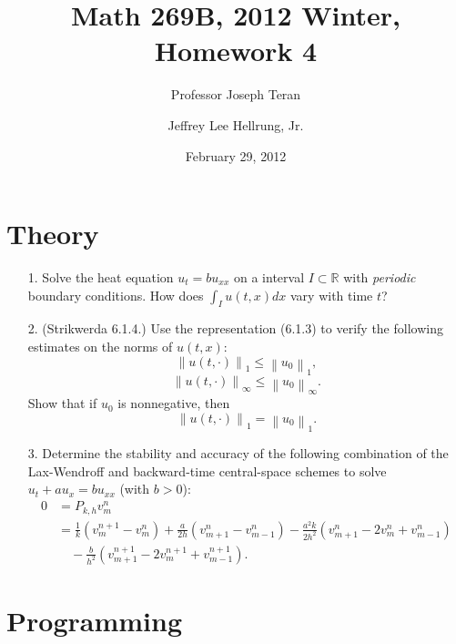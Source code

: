 \documentclass{article}
\providecommand{\norm}[1]{\left\lVert#1\right\rVert}
\begin{document}
\title{Math 269B, 2012 Winter, Homework 4}
\date{February 29, 2012}
\author{Professor Joseph Teran \and Jeffrey Lee Hellrung, Jr.}
\maketitle

\section{Theory}

\begin{itemize}

\item[1.] Solve the heat equation $u_t = b u_{xx}$ on a interval $I \subset \mathbb{R}$ with \emph{periodic} boundary conditions. How does $\int_I u(t,x) dx$ vary with time $t$?

\item[2.] (Strikwerda 6.1.4.) Use the representation (6.1.3) to verify the following estimates on the norms of $u(t,x)$:
\begin{equation*}
\norm{u(t,\cdot)}_1 \leq \norm{u_0}_1,
\end{equation*}
\begin{equation*}
\norm{u(t,\cdot)}_{\infty} \leq \norm{u_0}_{\infty}.
\end{equation*}
Show that if $u_0$ is nonnegative, then
\begin{equation*}
\norm{u(t,\cdot)}_1 = \norm{u_0}_1.
\end{equation*}

\item[3.] Determine the stability and accuracy of the following combination of the Lax-Wendroff and backward-time central-space schemes to solve $u_t + a u_x = b u_{xx}$ (with $b > 0$):
\begin{align*}
0 & = P_{k,h} v^n_m \\
  & = \frac{1}{k} \left( v^{n+1}_m - v^n_m \right) + \frac{a}{2h} \left( v^n_{m+1} - v^n_{m-1} \right) - \frac{a^2k}{2h^2} \left( v^n_{m+1} - 2 v^n_m + v^n_{m-1} \right) \\
  & \quad {} - \frac{b}{h^2} \left( v^{n+1}_{m+1} - 2 v^{n+1}_m + v^{n+1}_{m-1} \right).
\end{align*}

\end{itemize}

\section{Programming}
\end{document}
